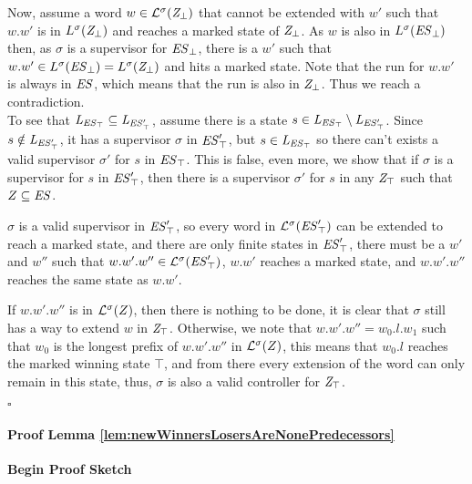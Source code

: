 Now, assume a word $w \in 
\mathcal{L}^\sigma(\mathit{Z_{\bot}})$ that cannot be extended with $w'$ such that $w.w'$ is 
in $L^\sigma(\mathit{Z_{\bot}})$ and reaches a marked state of $\mathit{Z_{\bot}}$. 
As  $w$ is also in $L^\sigma(\mathit{\mathit{ES}_{\bot}})$ then, as
$\sigma$ is a supervisor for $\mathit{\mathit{ES}_{\bot}}$, there is a $w'$ such that 
$w.w' \in L^\sigma(\mathit{\mathit{ES}_{\bot}}) = L^\sigma(\mathit{Z_{\bot}})$ 
and hits a marked state. Note that the run for $w.w'$ is always in $\mathit{ES}$, which means 
that the run is also in $\mathit{Z_{\bot}}$. Thus we reach a contradiction.\\

To see that $\mathit{L_{\mathit{\mathit{ES}_{\top}}}} \subseteq \mathit{L_{\mathit{\mathit{ES}'_{\top}}}}$, assume there is a state $s \in \mathit{L_{\mathit{\mathit{ES}_{\top}}}} \setminus \mathit{L_{\mathit{\mathit{ES}'_{\top}}}}$. Since $s \notin \mathit{L_{\mathit{\mathit{ES}'_{\top}}}}$, it has a supervisor $\sigma$ in $\mathit{\mathit{ES}'_{\top}}$, but $s \in \mathit{L_{\mathit{\mathit{ES}_{\top}}}}$ so there can't exists a valid supervisor $\sigma'$ for $s$ in $\mathit{\mathit{ES}_{\top}}$. This is false, even more, we show that if $\sigma$ is a supervisor for $s$ in $\mathit{\mathit{ES}'_{\top}}$, then there is a supervisor $\sigma'$ for $s$ in any $\mathit{Z_{\top}}$ such that $Z \subseteq \mathit{ES}$.

$\sigma$ is a valid supervisor in $\mathit{\mathit{ES}'_{\top}}$, so every word in $\mathcal{L}^\sigma(\mathit{\mathit{ES}'_{\top}})$ can be extended to reach a marked state, and there are only finite states in $\mathit{\mathit{ES}'_{\top}}$, there must be a $w'$ and $w''$ such that $w.w'.w'' \in \mathcal{L}^\sigma(\mathit{\mathit{ES}'_{\top}})$, $w.w'$ reaches a marked state, and $w.w'.w''$ reaches the same state as $w.w'$.

If $w.w'.w''$ is in $\mathcal{L}^\sigma(Z)$, then there is nothing to be done, it is clear that $\sigma$ still has a way to extend $w$ in $\mathit{Z_{\top}}$. Otherwise, we note that $w.w'.w'' = w_0.l.w_1$ such that $w_0$ is the longest prefix of $w.w'.w''$ in $\mathcal{L}^\sigma(Z)$, this means that $w_0.l$ reaches the marked winning state $\top$, and from there every extension of the word can only remain in this state, thus, $\sigma$ is also a valid controller for $\mathit{Z_{\top}}$.
 
\begin{flushright}
$\square$
\end{flushright}


\paragraph*{Proof Lemma 
\ref{lem:newWinnersLosersAreNonePredecessors}}
\textbf{{Begin Proof Sketch}}

